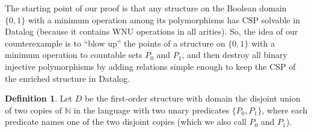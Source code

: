 \documentclass{article}
\theoremstyle{remark}
\theoremstyle{definition}
\newtheorem{definition}[theorem]{Definition}
\begin{document}
The starting point of our proof is that any structure on the Boolean domain $\{0,1\}$ with a minimum operation among its polymorphisms has $\mathrm{CSP}$ solvable in Datalog (because it contains WNU operations in all arities). So, the idea of our counterexample is to ``blow up'' the points of a structure on $\{0,1\}$ with a minimum operation to countable sets $P_0$ and $P_1$,  and then destroy all binary injective polymorphisms by adding relations  simple enough to keep the $\mathrm{CSP}$ of the enriched  structure in Datalog. %


\begin{definition} Let $D$ be the first-order structure with domain the disjoint union of two copies of $\mathbb{N}$ in the language with two unary predicates $\{P_0,P_1\}$, where each predicate names one of the two disjoint copies (which we also call $P_0$ and $P_1$). 
\end{definition}
\end{document}
